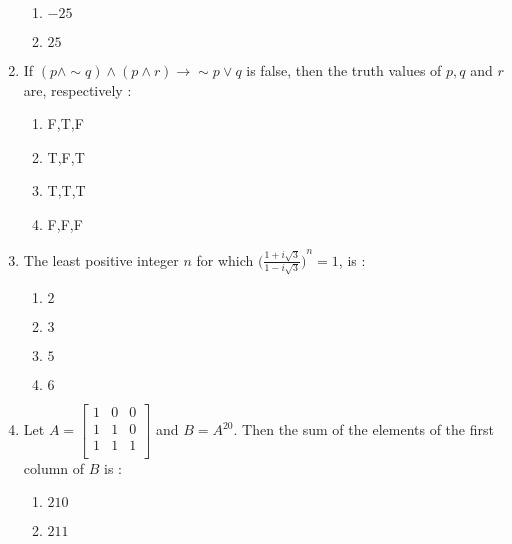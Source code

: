 \documentclass[journal,12pt,twocolumn]{IEEEtran}
\begin{document}
\begin{enumerate}[1.]
\begin{enumerate}[(1)]
\item $
-25
$

\item $
25
$


\end{enumerate}


\item If $ (p \wedge \sim q) \wedge (p \wedge r) \rightarrow \sim p \vee q $ is false, then the truth values of $p,q$ and $r$ are, respectively :


\begin{enumerate}[(1)]
 
\item F,T,F

\item T,F,T

\item T,T,T

\item F,F,F


\end{enumerate}

\item The least positive integer $n$ for which $ {\Big(\frac{1+i\sqrt{3}}{1-i\sqrt{3}} \Big)}^{n}=1 $, is :


\begin{enumerate}[(1)]
 
\item $
2
$

\item $
3
$

\item $
5
$

\item $
6
$


\end{enumerate}


\item Let $A= \left[{\begin{array}{ccc}
1 & 0 & 0\\
1 & 1 & 0\\
1 & 1 & 1\\

\end{array}}\right]$  and $B=A^{20}$. Then the sum of the elements of the first column of $B$ is :


\begin{enumerate}[(1)]
 
\item $
210
$

\item $
211
$


\end{enumerate}
\end{enumerate}
\end{document}
